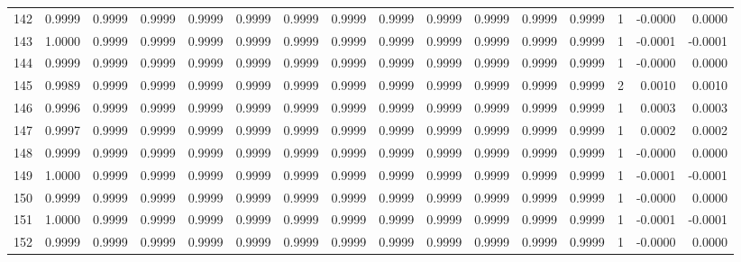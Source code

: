 \begin{tabular}{lrrrrrrrrrrrrrrr}
142 &      0.9999 &  0.9999 &  0.9999 &  0.9999 &  0.9999 &  0.9999 &  0.9999 &  0.9999 &  0.9999 &  0.9999 &   0.9999 &     0.9999 &      1 &                   -0.0000 &                     0.0000 \\
143 &      1.0000 &  0.9999 &  0.9999 &  0.9999 &  0.9999 &  0.9999 &  0.9999 &  0.9999 &  0.9999 &  0.9999 &   0.9999 &     0.9999 &      1 &                   -0.0001 &                    -0.0001 \\
144 &      0.9999 &  0.9999 &  0.9999 &  0.9999 &  0.9999 &  0.9999 &  0.9999 &  0.9999 &  0.9999 &  0.9999 &   0.9999 &     0.9999 &      1 &                   -0.0000 &                     0.0000 \\
145 &      0.9989 &  0.9999 &  0.9999 &  0.9999 &  0.9999 &  0.9999 &  0.9999 &  0.9999 &  0.9999 &  0.9999 &   0.9999 &     0.9999 &      2 &                    0.0010 &                     0.0010 \\
146 &      0.9996 &  0.9999 &  0.9999 &  0.9999 &  0.9999 &  0.9999 &  0.9999 &  0.9999 &  0.9999 &  0.9999 &   0.9999 &     0.9999 &      1 &                    0.0003 &                     0.0003 \\
147 &      0.9997 &  0.9999 &  0.9999 &  0.9999 &  0.9999 &  0.9999 &  0.9999 &  0.9999 &  0.9999 &  0.9999 &   0.9999 &     0.9999 &      1 &                    0.0002 &                     0.0002 \\
148 &      0.9999 &  0.9999 &  0.9999 &  0.9999 &  0.9999 &  0.9999 &  0.9999 &  0.9999 &  0.9999 &  0.9999 &   0.9999 &     0.9999 &      1 &                   -0.0000 &                     0.0000 \\
149 &      1.0000 &  0.9999 &  0.9999 &  0.9999 &  0.9999 &  0.9999 &  0.9999 &  0.9999 &  0.9999 &  0.9999 &   0.9999 &     0.9999 &      1 &                   -0.0001 &                    -0.0001 \\
150 &      0.9999 &  0.9999 &  0.9999 &  0.9999 &  0.9999 &  0.9999 &  0.9999 &  0.9999 &  0.9999 &  0.9999 &   0.9999 &     0.9999 &      1 &                   -0.0000 &                     0.0000 \\
151 &      1.0000 &  0.9999 &  0.9999 &  0.9999 &  0.9999 &  0.9999 &  0.9999 &  0.9999 &  0.9999 &  0.9999 &   0.9999 &     0.9999 &      1 &                   -0.0001 &                    -0.0001 \\
152 &      0.9999 &  0.9999 &  0.9999 &  0.9999 &  0.9999 &  0.9999 &  0.9999 &  0.9999 &  0.9999 &  0.9999 &   0.9999 &     0.9999 &      1 &                   -0.0000 &                     0.0000 \\

\end{tabular}
